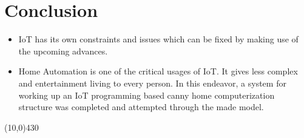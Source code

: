 \documentclass[12pt, letterpaper]{article}
\begin{document}
\hspace{1cm}

\section{Conclusion}
\begin{itemize}
\item IoT has its own constraints and issues which can be fixed by making use of the upcoming advances.
\item Home Automation is one of the critical usages of IoT. It gives less complex and entertainment living to every person. In this endeavor, a system for working up an IoT programming based canny home computerization structure was completed and attempted through the made model.
\end{itemize}

\begin{center}
\line(10,0){430}
\end{center}
\end{document}
